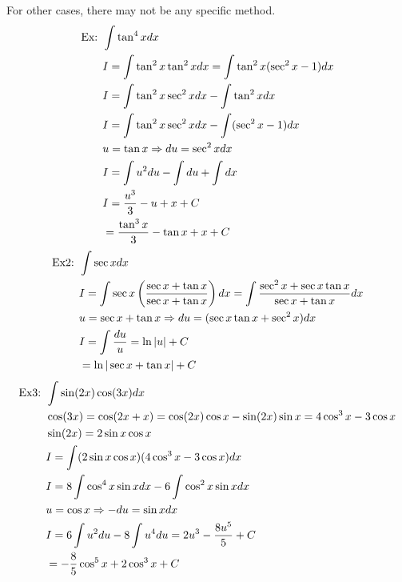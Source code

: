 \documentclass[11pt, fleqn]{article}
\begin{document}
For other cases, there may not be any specific method.
\begin{align*}
    \text{Ex: }&\int\tan^4xdx\\
    &I=\int\tan^2x\tan^2xdx=\int\tan^2x(\sec^2x-1)dx\\
    &I=\int\tan^2x\sec^2xdx-\int\tan^2xdx\\
    &I=\int\tan^2x\sec^2xdx-\int(\sec^2x-1)dx\\
    &u=\tan x\Rightarrow du=\sec^2xdx\\
    &I=\int u^2du-\int du+\int dx\\
    &I=\frac{u^3}{3}-u+x+C\\
    &=\frac{\tan^3x}{3}-\tan x+x+C
\end{align*}
\begin{align*}
    \text{Ex2: }&\int\sec xdx\\
    &I=\int\sec x\left( \frac{\sec x+\tan x}{\sec x+\tan x} \right)dx=\int\frac{\sec^2x+\sec x\tan x}{\sec x+\tan x}dx\\
    &u=\sec x+\tan x\Rightarrow du=(\sec x\tan x+\sec^2x)dx\\
    &I=\int\frac{du}{u}=\ln|u|+C\\
    &=\ln|\sec x+\tan x|+C
\end{align*}
\begin{align*}
    \text{Ex3: }&\int\sin(2x)\cos(3x)dx\\
    &\cos(3x)=\cos(2x+x)=\cos(2x)\cos x-\sin (2x)\sin x=4\cos^3x-3\cos x\\
    &\sin(2x)=2\sin x\cos x\\
    &I=\int(2\sin x\cos x)(4\cos^3x-3\cos x)dx\\
    &I=8\int\cos^4x\sin xdx-6\int\cos^2x\sin xdx\\
    &u=\cos x\Rightarrow -du=\sin xdx\\
    &I=6\int u^2du-8\int u^4du=2u^3-\frac{8u^5}{5}+C\\
    &=-\frac{8}{5}\cos^5x+2\cos^3x+C
\end{align*}
\end{document}
